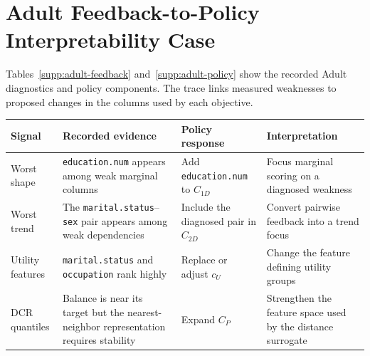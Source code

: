 \documentclass[conference]{IEEEtran}
\newcommand{\col}[1]{\texttt{#1}}
\begin{document}
\section{Adult Feedback-to-Policy Interpretability Case}
\label{supp:adult}
Tables~\ref{supp:adult-feedback} and~\ref{supp:adult-policy} show the recorded Adult diagnostics and policy components. The trace links measured weaknesses to proposed changes in the columns used by each objective.

\par\medskip\noindent\begin{minipage}{\textwidth}
\centering
{}
\label{supp:adult-feedback}
\small
\begin{tabularx}{\textwidth}{@{}p{}X X X@{}}
\toprule
Signal & Recorded evidence & Policy response & Interpretation\\
\midrule
Worst shape & \col{education.num} appears among weak marginal columns & Add \col{education.num} to $C_{1D}$ & Focus marginal scoring on a diagnosed weakness\\
Worst trend & The \col{marital.status}--\col{sex} pair appears among weak dependencies & Include the diagnosed pair in $C_{2D}$ & Convert pairwise feedback into a trend focus\\
Utility features & \col{marital.status} and \col{occupation} rank highly & Replace or adjust $c_U$ & Change the feature defining utility groups\\
DCR quantiles & Balance is near its target but the nearest-neighbor representation requires stability & Expand $C_P$ & Strengthen the feature space used by the distance surrogate\\
\bottomrule
\end{tabularx}
\end{minipage}\par\medskip
\end{document}
